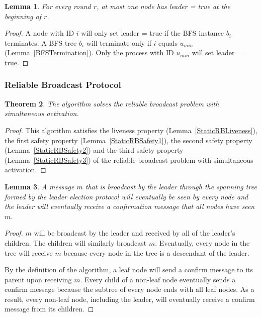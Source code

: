\documentclass[english]{article}
\newtheorem{theorem}{Theorem}[section]
\newtheorem{lemma}[theorem]{Lemma}
\begin{document}
\begin{lemma}
\label{LESafetyStatic}
For every round $r$, at most one node has leader = true at the beginning of $r$.
\end{lemma}
\begin{proof}
A node with ID $i$ will only set leader = true if the BFS instance $b_i$ terminates.
A BFS tree $b_i$ will terminate only if $i$ equals $u_{min}$ (Lemma~\ref{BFSTermination}).
Only the process with ID $u_{min}$ will set leader = true. 
\end{proof}

\subsubsection {Reliable Broadcast Protocol}

\begin{theorem}
\label{StaticReliableBroadcast}
The algorithm solves the reliable broadcast problem with simultaneous activation.
\end{theorem}
\begin{proof}
This algorithm satisfies the liveness property (Lemma~\ref{StaticRBLiveness}), 
the first safety property (Lemma~\ref{StaticRBSafety1}),
the second safety property (Lemma~\ref{StaticRBSafety2}) and 
the third safety property (Lemma~\ref{StaticRBSafety3}) of the reliable broadcast problem with simultaneous activation.
\end{proof}


\begin{lemma}
\label{StaticSpanningTree}
A message $m$ that is broadcast by the leader through the spanning tree formed by the leader election protocol will eventually be seen by every node and the leader will eventually receive a confirmation message that all nodes have seen $m$.
\end{lemma}
\begin{proof}

$m$ will be broadcast by the leader and received by all of the leader's children. The children will similarly broadcast $m$. Eventually, every node in the tree will receive $m$ because every node in the tree is a descendant of the leader. 

By the definition of the algorithm, a leaf node will send a confirm message to its parent upon receiving $m$. Every child of a non-leaf node eventually sends a confirm message because the subtree of every node ends with all leaf nodes. As a result, every non-leaf node, including the leader, will eventually receive a confirm message from its children.

\end{proof}
\end{document}
